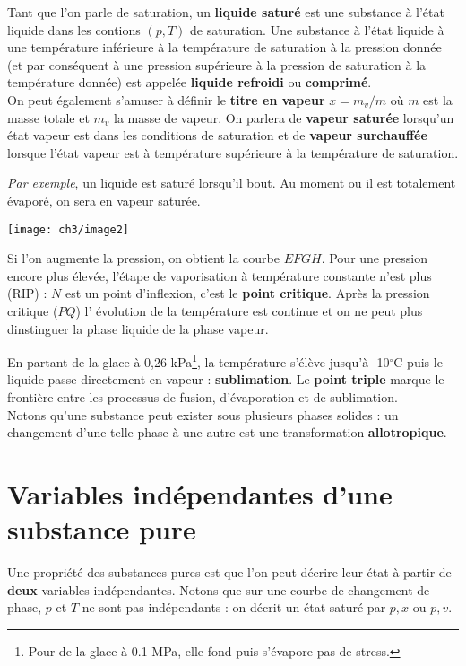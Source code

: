Tant que l'on parle de saturation, un \textbf{liquide saturé} est une 
substance à l'état liquide dans les contions $(p,T)$ de saturation. 
Une substance à l’état liquide à une température inférieure à la 
température de saturation à la pression donnée (et par conséquent à 
une pression supérieure à la pression de saturation à la température 
donnée) est appelée \textbf{liquide refroidi} ou \textbf{comprimé}.\\

\noindent
On peut également s'amuser à définir le \textbf{titre en vapeur} $
x = m_v/m$ où $m$ est la masse totale et $m_v$ la masse de vapeur. On 
parlera de \textbf{vapeur saturée} lorsqu'un état vapeur est dans les 
conditions de saturation et de \textbf{vapeur surchauffée} lorsque 
l'état vapeur est à température supérieure à la température de 
saturation.


\textit{Par exemple}, un liquide est saturé lorsqu'il bout. Au moment 
ou il est totalement évaporé, on sera en vapeur saturée.


\begin{center}
	\texttt{[image: ch3/image2]}
\end{center}

Si l'on augmente la pression, on obtient la courbe $EFGH$. Pour une 
pression encore plus élevée, l'étape de vaporisation à température 
constante n'est plus (RIP) : $N$ est un point d'inflexion, c'est le 
\textbf{point critique}. Après la pression critique ($PQ$) l'
évolution de la température est continue et on ne peut plus 
dinstinguer la phase liquide de la phase vapeur. 

En partant de la glace à 0,26 kPa\footnote{Pour de la glace à 0.1 MPa, 
elle fond puis s'évapore pas de stress.}, la température s'élève jusqu'à 
-10$^\circ$C puis le liquide passe directement en vapeur : \textbf{
	sublimation}. Le \textbf{point triple} marque le frontière entre 
les processus de fusion, d'évaporation et de sublimation.\\

\noindent
Notons qu'une substance peut exister sous plusieurs phases solides : 
un changement d'une telle phase à une autre est une transformation 
\textbf{allotropique}.

\section{Variables indépendantes d'une substance pure}
Une propriété des substances pures est que l'on peut décrire leur 
état à partir de \textbf{deux} variables indépendantes. Notons que
sur une courbe de changement de phase, $p$ et $T$ ne sont pas 
indépendants : on décrit un état saturé par $p,x$ ou $p,v$.


